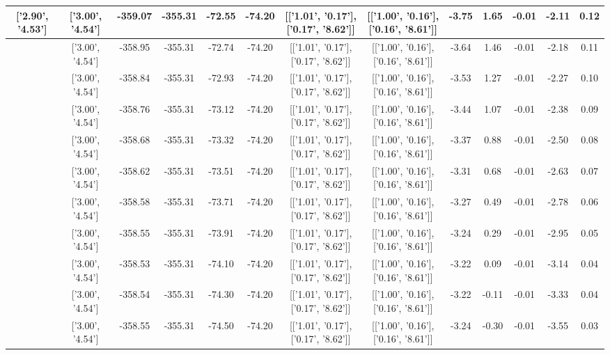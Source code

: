\begin{table}[htbp]
\begin{adjustbox}{angle=90}
\begin{tabular}{|c|c|c|c|c|c|c|c|c|c|c|c|c|}
 ['2.90', '4.53'] & ['3.00', '4.54'] & -359.07 & -355.31 & -72.55 & -74.20 & [['1.01', '0.17'], ['0.17', '8.62']] & [['1.00', '0.16'], ['0.16', '8.61']] & -3.75 & 1.65 & -0.01 & -2.11 & 0.12\\ \hline
 ['2.91', '4.53'] & ['3.00', '4.54'] & -358.95 & -355.31 & -72.74 & -74.20 & [['1.01', '0.17'], ['0.17', '8.62']] & [['1.00', '0.16'], ['0.16', '8.61']] & -3.64 & 1.46 & -0.01 & -2.18 & 0.11\\ \hline
 ['2.92', '4.53'] & ['3.00', '4.54'] & -358.84 & -355.31 & -72.93 & -74.20 & [['1.01', '0.17'], ['0.17', '8.62']] & [['1.00', '0.16'], ['0.16', '8.61']] & -3.53 & 1.27 & -0.01 & -2.27 & 0.10\\ \hline
 ['2.93', '4.53'] & ['3.00', '4.54'] & -358.76 & -355.31 & -73.12 & -74.20 & [['1.01', '0.17'], ['0.17', '8.62']] & [['1.00', '0.16'], ['0.16', '8.61']] & -3.44 & 1.07 & -0.01 & -2.38 & 0.09\\ \hline
 ['2.95', '4.53'] & ['3.00', '4.54'] & -358.68 & -355.31 & -73.32 & -74.20 & [['1.01', '0.17'], ['0.17', '8.62']] & [['1.00', '0.16'], ['0.16', '8.61']] & -3.37 & 0.88 & -0.01 & -2.50 & 0.08\\ \hline
 ['2.96', '4.54'] & ['3.00', '4.54'] & -358.62 & -355.31 & -73.51 & -74.20 & [['1.01', '0.17'], ['0.17', '8.62']] & [['1.00', '0.16'], ['0.16', '8.61']] & -3.31 & 0.68 & -0.01 & -2.63 & 0.07\\ \hline
 ['2.97', '4.54'] & ['3.00', '4.54'] & -358.58 & -355.31 & -73.71 & -74.20 & [['1.01', '0.17'], ['0.17', '8.62']] & [['1.00', '0.16'], ['0.16', '8.61']] & -3.27 & 0.49 & -0.01 & -2.78 & 0.06\\ \hline
 ['2.98', '4.54'] & ['3.00', '4.54'] & -358.55 & -355.31 & -73.91 & -74.20 & [['1.01', '0.17'], ['0.17', '8.62']] & [['1.00', '0.16'], ['0.16', '8.61']] & -3.24 & 0.29 & -0.01 & -2.95 & 0.05\\ \hline
 ['2.99', '4.54'] & ['3.00', '4.54'] & -358.53 & -355.31 & -74.10 & -74.20 & [['1.01', '0.17'], ['0.17', '8.62']] & [['1.00', '0.16'], ['0.16', '8.61']] & -3.22 & 0.09 & -0.01 & -3.14 & 0.04\\ \hline
 ['3.01', '4.54'] & ['3.00', '4.54'] & -358.54 & -355.31 & -74.30 & -74.20 & [['1.01', '0.17'], ['0.17', '8.62']] & [['1.00', '0.16'], ['0.16', '8.61']] & -3.22 & -0.11 & -0.01 & -3.33 & 0.04\\ \hline
 ['3.02', '4.54'] & ['3.00', '4.54'] & -358.55 & -355.31 & -74.50 & -74.20 & [['1.01', '0.17'], ['0.17', '8.62']] & [['1.00', '0.16'], ['0.16', '8.61']] & -3.24 & -0.30 & -0.01 & -3.55 & 0.03\\ \hline

\end{tabular}
\end{adjustbox}
\end{table}
